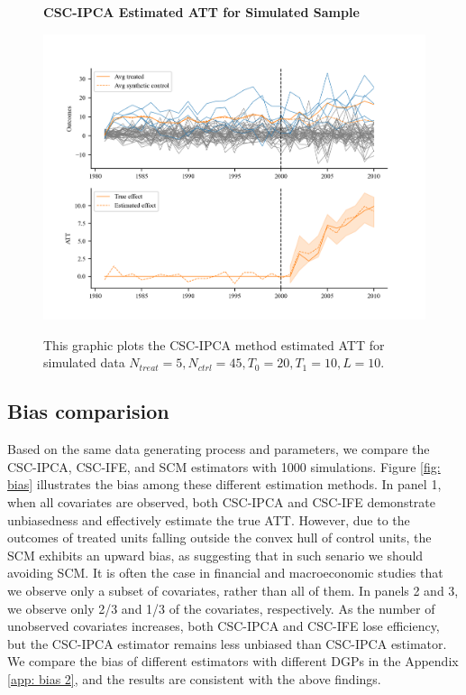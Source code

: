 \documentclass[12pt]{article}
\begin{document}
\begin{figure}[!ht]
    \centering
    \caption{\textbf{CSC-IPCA Estimated ATT for Simulated Sample}}
    \includegraphics{figs/estimation.png}
    \label{fig: est}
    \caption*{\footnotesize{This graphic plots the CSC-IPCA method estimated ATT for simulated data $N_{treat} = 5, N_{ctrl} = 45, T_0=20, T_1=10, L=10$.}}
    \end{figure}

\subsection{Bias comparision}
Based on the same data generating process and parameters, we compare the CSC-IPCA, CSC-IFE, and SCM estimators with 1000 simulations. Figure \ref{fig: bias} illustrates the bias among these different estimation methods. In panel 1, when all covariates are observed, both CSC-IPCA and CSC-IFE demonstrate unbiasedness and effectively estimate the true ATT. However, due to the outcomes of treated units falling outside the convex hull of control units, the SCM exhibits an upward bias, as \cite{abadie2010synthetic} suggesting that in such senario we should avoiding SCM. It is often the case in financial and macroeconomic studies that we observe only a subset of covariates, rather than all of them. In panels 2 and 3, we observe only 2/3 and 1/3 of the covariates, respectively. As the number of unobserved covariates increases, both CSC-IPCA and CSC-IFE lose efficiency, but the CSC-IPCA estimator remains less unbiased than CSC-IPCA estimator. We compare the bias of different estimators with different DGPs in the Appendix \ref{app: bias 2}, and the results are consistent with the above findings.
\end{document}
